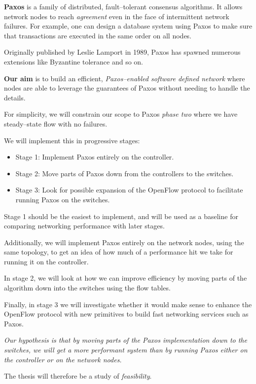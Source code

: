 \textbf{Paxos} \cite{Lamport:1998:PP:279227.279229} is a
family of distributed, fault--tolerant consensus algorithms.  It allows
network nodes to reach {\em agreement} even in the face of intermittent
network failures.  For example, one can design a database system using Paxos
to make sure that transactions are executed in the same order on all nodes.

Originally published by Leslie Lamport in 1989, Paxos
has spawned numerous extensions like Byzantine tolerance and so on.

\textbf{Our aim} is to build an efficient, {\em Paxos--enabled software defined
network} where nodes are able to leverage the guarantees of Paxos without
needing to handle the details.

For simplicity, we will constrain our scope to Paxos {\em phase two} where
we have steady--state flow with no failures.

We will implement this in progressive stages:

\begin{itemize}
\item Stage 1: Implement Paxos entirely on the controller.
\item Stage 2: Move parts of Paxos down from the controllers to the
switches.
\item Stage 3: Look for possible expansion of the OpenFlow protocol to
facilitate running Paxos on the switches.
\end{itemize}

Stage 1 should be the easiest to implement, and will be used as a baseline
for comparing networking performance with later stages.

Additionally, we will implement Paxos entirely on the network nodes, using
the same topology, to get an idea of how much of a performance hit we take
for running it on the controller.

In stage 2, we will look at how we can improve efficiency by moving parts of
the algorithm down into the switches using the flow tables.

Finally, in stage 3 we will investigate whether it would make sense to
enhance the OpenFlow protocol with new primitives to build fast
networking services such as Paxos.

{\em 
  Our hypothesis is that by moving parts of the Paxos implementation down to
  the switches, we will get a more performant system than by running Paxos
  either on the controller or on the network nodes.
}

The thesis will therefore be a study of {\em feasibility}.
